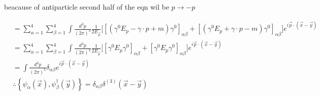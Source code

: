 \documentclass[12pt, letterpaper]{article}
\newcommand*{\1}{\hspace{1pt}}
\begin{document}
beacause of antiparticle second half of the eqn wil be  $ p \to -p$

\begin{align*}
    &= \sum_{\alpha = 1}^{4}\sum_{\beta = 1}^{4} \int \frac{d ^{3} p}{(2 \pi) ^{3}} \frac{1}{{2 E _{\overrightarrow{p}}}} \bigg[ [(\gamma ^{0} E _{p} -\gamma \cdot p + m)\gamma ^{0} ]_{\alpha \beta} + [(\gamma ^{0} E _{p} +\gamma \cdot p - m)\gamma ^{0} ]_{\alpha \beta} \bigg]e ^{i \overrightarrow{p} \cdot (\overrightarrow{x} - \overrightarrow{y})} \\
    &= \sum_{\alpha = 1}^{4}\sum_{\beta = 1}^{4} \int \frac{d ^{3} p}{(2 \pi) ^{3}} \frac{1}{{2 E _{\overrightarrow{p}}}} \bigg[  [ \gamma ^{0} E_{p} \gamma ^{0} ]_{\alpha \beta} + [\gamma ^{0} E _{p} \gamma ^{0} ]_{\alpha \beta} \bigg]e ^{i \overrightarrow{p} \cdot (\overrightarrow{x} - \overrightarrow{y})} \\
    &= \int \frac{d ^{3} p}{(2 \pi) ^{3}} \delta _{\alpha \beta} e ^{i \overrightarrow{p} \cdot (\overrightarrow{x} - \overrightarrow{y})} \\
    &\therefore \left\{ \psi _{\alpha} (\overrightarrow{x}) , \psi ^{\dagger} _{\beta }(\overrightarrow{y})  \right\} = \delta _{\alpha \beta} \delta ^{(3)} (\overrightarrow{x} - \overrightarrow{y})
\end{align*}
\end{document}
